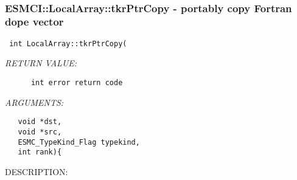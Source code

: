  
\mbox{}\hrulefill\
 
\subsubsection [ESMCI::LocalArray::tkrPtrCopy] {ESMCI::LocalArray::tkrPtrCopy - portably copy Fortran dope vector}


  
\begin{verbatim} int LocalArray::tkrPtrCopy(\end{verbatim}{\em RETURN VALUE:}
\begin{verbatim}      int error return code\end{verbatim}{\em ARGUMENTS:}
\begin{verbatim}   void *dst, 
   void *src, 
   ESMC_TypeKind_Flag typekind,
   int rank){\end{verbatim}
{\sf DESCRIPTION:\\ }


        
  
\setlength{\parskip}{\oldparskip}
\setlength{\parindent}{\oldparindent}
\setlength{\baselineskip}{\oldbaselineskip}
